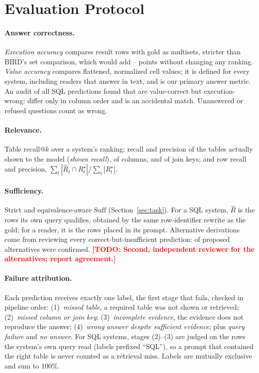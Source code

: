 \documentclass[11pt]{article}
\newif\ifdraft \drafttrue   %
\newcommand{\todo}[1]{\ifdraft\textcolor{red}{\textbf{[TODO: #1]}}\fi}
\begin{document}
\section{Evaluation Protocol}\label{sec:eval}
\paragraph{Answer correctness.} \emph{Execution accuracy} compares result rows with gold as multisets, stricter than BIRD's set comparison, which would add \setGainMin{}--\setGainMax{} points without changing any ranking. \emph{Value accuracy} compares flattened, normalized cell values; it is defined for every system, including readers that answer in text, and is our primary answer metric. An audit of all \nSqlPredictions{} SQL predictions found \nValueOnly{} that are value-correct but execution-wrong: \nValueColOrder{} differ only in column order and \nValueAccidental{} is an accidental match. Unanswered or refused questions count as wrong.

\paragraph{Relevance.} Table recall@$k$ over a system's ranking; recall and precision of the tables actually shown to the model (\emph{shown recall}), of columns, and of join keys; and row recall and precision, $\sum_t|\hat R_t\cap R^\star_t|/\sum_t|R^\star_t|$.

\paragraph{Sufficiency.} Strict and equivalence-aware $\mathrm{Suff}$ (Section~\ref{sec:task}). For a SQL system, $\hat R$ is the rows its own query qualifies, obtained by the same row-identifier rewrite as the gold; for a reader, it is the rows placed in its prompt. Alternative derivations come from reviewing every correct-but-insufficient prediction: \nAltConfirmed{} of \nAltReviewed{} proposed alternatives were confirmed. \todo{Second, independent reviewer for the \nAltReviewed{} alternatives; report agreement.}

\paragraph{Failure attribution.} Each prediction receives exactly one label, the first stage that fails, checked in pipeline order: (1)~\emph{missed table}, a required table was not shown or retrieved; (2)~\emph{missed column or join key}; (3)~\emph{incomplete evidence}, the evidence does not reproduce the answer; (4)~\emph{wrong answer despite sufficient evidence}; plus \emph{query failure} and \emph{no answer}. For SQL systems, stages (2)--(3) are judged on the rows the system's own query read (labels prefixed ``SQL''), so a prompt that contained the right table is never counted as a retrieval miss. Labels are mutually exclusive and sum to 100\%.
\end{document}
